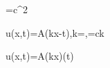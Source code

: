 =c^2

u(x,t)=A\sin(kx-\omega t),\qquad k=\frac{2\pi}{\lambda},\quad\omega=ck

u(x,t)=A\sin(kx)\cos(\omega t)
